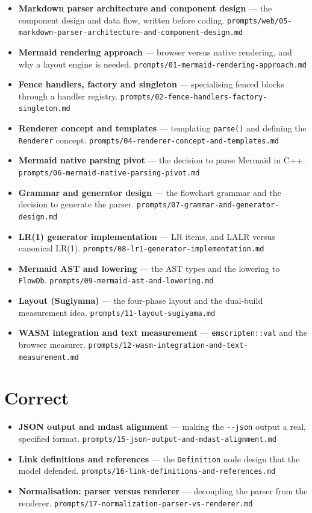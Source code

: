 \documentclass[12pt]{report}
\begin{document}
\begin{itemize}
  \item \textbf{Markdown parser architecture and component design} --- the component design and data flow, written before coding. \texttt{prompts/web/05-markdown-parser-architecture-and-component-design.md}
  \item \textbf{Mermaid rendering approach} --- browser versus native rendering, and why a layout engine is needed. \texttt{prompts/01-mermaid-rendering-approach.md}
  \item \textbf{Fence handlers, factory and singleton} --- specialising fenced blocks through a handler registry. \texttt{prompts/02-fence-handlers-factory-singleton.md}
  \item \textbf{Renderer concept and templates} --- templating \verb|parse()| and defining the \verb|Renderer| concept. \texttt{prompts/04-renderer-concept-and-templates.md}
  \item \textbf{Mermaid native parsing pivot} --- the decision to parse Mermaid in C++. \texttt{prompts/06-mermaid-native-parsing-pivot.md}
  \item \textbf{Grammar and generator design} --- the flowchart grammar and the decision to generate the parser. \texttt{prompts/07-grammar-and-generator-design.md}
  \item \textbf{LR(1) generator implementation} --- LR items, and LALR versus canonical LR(1). \texttt{prompts/08-lr1-generator-implementation.md}
  \item \textbf{Mermaid AST and lowering} --- the AST types and the lowering to \verb|FlowDb|. \texttt{prompts/09-mermaid-ast-and-lowering.md}
  \item \textbf{Layout (Sugiyama)} --- the four-phase layout and the dual-build measurement idea. \texttt{prompts/11-layout-sugiyama.md}
  \item \textbf{WASM integration and text measurement} --- \verb|emscripten::val| and the browser measurer. \texttt{prompts/12-wasm-integration-and-text-measurement.md}
\end{itemize}

\section{Correct}

\begin{itemize}
  \item \textbf{JSON output and mdast alignment} --- making the \verb|--json| output a real, specified format. \texttt{prompts/15-json-output-and-mdast-alignment.md}
  \item \textbf{Link definitions and references} --- the \verb|Definition| node design that the model defended. \texttt{prompts/16-link-definitions-and-references.md}
  \item \textbf{Normalisation: parser versus renderer} --- decoupling the parser from the renderer. \texttt{prompts/17-normalization-parser-vs-renderer.md}
\end{itemize}
\end{document}
